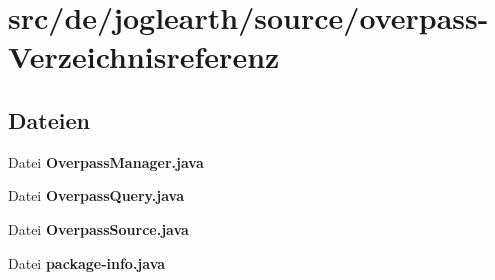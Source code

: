 \section{src/de/joglearth/source/overpass-\/\-Verzeichnisreferenz}
\label{dir_a852481a77c50616f6331ca3edffa474}
\subsection*{Dateien}
\begin{DoxyCompactItemize}
\item 
Datei {\bfseries Overpass\-Manager.\-java}
\item 
Datei {\bfseries Overpass\-Query.\-java}
\item 
Datei {\bfseries Overpass\-Source.\-java}
\item 
Datei {\bfseries package-\/info.\-java}
\end{DoxyCompactItemize}
